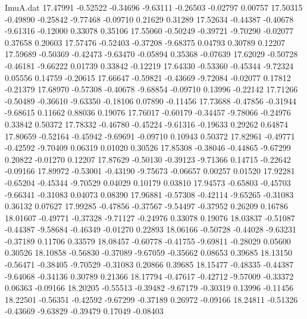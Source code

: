 \begin{filecontents}{ImuA.dat}
  17.47991   -0.52522   -0.34696   -9.63111   -0.26503   -0.02797    0.00757
  17.50315   -0.49890   -0.25842   -9.77468   -0.09710    0.21629    0.31289
  17.52634   -0.44387   -0.40678   -9.61316   -0.12000    0.33078    0.35106
  17.55060   -0.50249   -0.39721   -9.70290   -0.02077    0.37658    0.20603
  17.57476   -0.52403   -0.37208   -9.68375    0.04793    0.30789    0.12207
  17.59689   -0.50369   -0.42473   -9.63470   -0.05894    0.35368   -0.07639
  17.62029   -0.50728   -0.46181   -9.66222    0.01739    0.33842   -0.12219
  17.64330   -0.53360   -0.45344   -9.72324    0.05556    0.14759   -0.20615
  17.66647   -0.59821   -0.43669   -9.72084   -0.02077    0.17812   -0.21379
  17.68970   -0.57308   -0.40678   -9.68854   -0.09710    0.13996   -0.22142
  17.71266   -0.50489   -0.36610   -9.63350   -0.18106    0.07890   -0.11456
  17.73688   -0.47856   -0.31944   -9.68615    0.11662    0.88036    0.19076
  17.76017   -0.60179   -0.34457   -9.78066   -0.24976    0.33842    0.50372
  17.78332   -0.46780   -0.45224   -9.61316   -0.19633    0.29262    0.64874
  17.80659   -0.52164   -0.45942   -9.69691   -0.09710    0.10943    0.50372
  17.82961   -0.49771   -0.42592   -9.70409    0.06319    0.01020    0.30526
  17.85308   -0.38046   -0.44865   -9.67299    0.20822   -0.01270    0.12207
  17.87629   -0.50130   -0.39123   -9.71366    0.14715   -0.22642   -0.09166
  17.89972   -0.53001   -0.43190   -9.75673   -0.06657    0.00257    0.01520
  17.92281   -0.65204   -0.45344   -9.70529    0.04029    0.10179    0.03810
  17.94573   -0.65803   -0.45703   -9.66341   -0.31083    0.04073    0.08390
  17.96881   -0.57308   -0.42114   -9.65265   -0.31083    0.36132    0.07627
  17.99285   -0.47856   -0.37567   -9.54497   -0.37952    0.26209    0.16786
  18.01607   -0.49771   -0.37328   -9.71127   -0.24976    0.33078    0.19076
  18.03837   -0.51087   -0.44387   -9.58684   -0.46349   -0.01270    0.22893
  18.06166   -0.50728   -0.44028   -9.63231   -0.37189    0.11706    0.33579
  18.08457   -0.60778   -0.41755   -9.69811   -0.28029    0.05600    0.30526
  18.10858   -0.56830   -0.37089   -9.67059   -0.35662    0.08653    0.39685
  18.13150   -0.56471   -0.38405   -9.70529   -0.31083    0.20866    0.39685
  18.15477   -0.48335   -0.44387   -9.64068   -0.34136    0.30789    0.21366
  18.17794   -0.47617   -0.42712   -9.57009   -0.33372    0.06363   -0.09166
  18.20205   -0.55513   -0.39482   -9.67179   -0.30319    0.13996   -0.11456
  18.22501   -0.56351   -0.42592   -9.67299   -0.37189    0.26972   -0.09166
  18.24811   -0.51326   -0.43669   -9.63829   -0.39479    0.17049   -0.08403

\end{filecontents}
